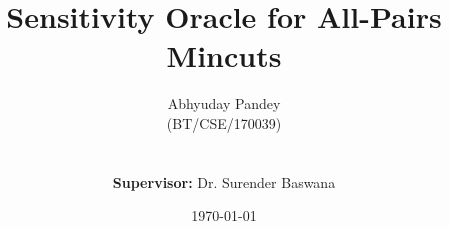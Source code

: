 % 
% 
%
%
%
%
%
%
%
%
% 
% 


\title{Sensitivity Oracle for All-Pairs Mincuts}

\author{Abhyuday Pandey\\(BT/CSE/170039)\\\\\\\textbf{Supervisor:} Dr. Surender Baswana}
\date{\today}


